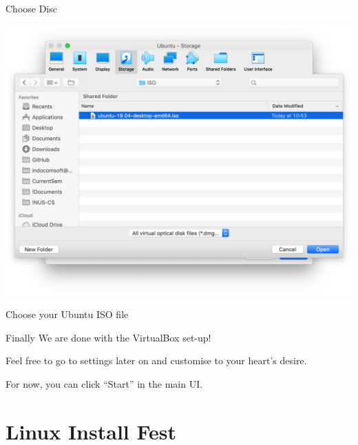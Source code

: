 \documentclass[12pt]{beamer}
\begin{document}
\begin{frame}{Choose Disc}
  \begin{center}
    \includegraphics[width=0.7\linewidth]{vb-disc}
  \end{center}
  Choose your Ubuntu ISO file
\end{frame}

\begin{frame}{Finally}
  We are done with the VirtualBox set-up!

  Feel free to go to settings later on and customise to your heart's desire.

  For now, you can click ``Start'' in the main UI.
\end{frame}

\section{Linux Install Fest}
\subsection{}
\end{document}
